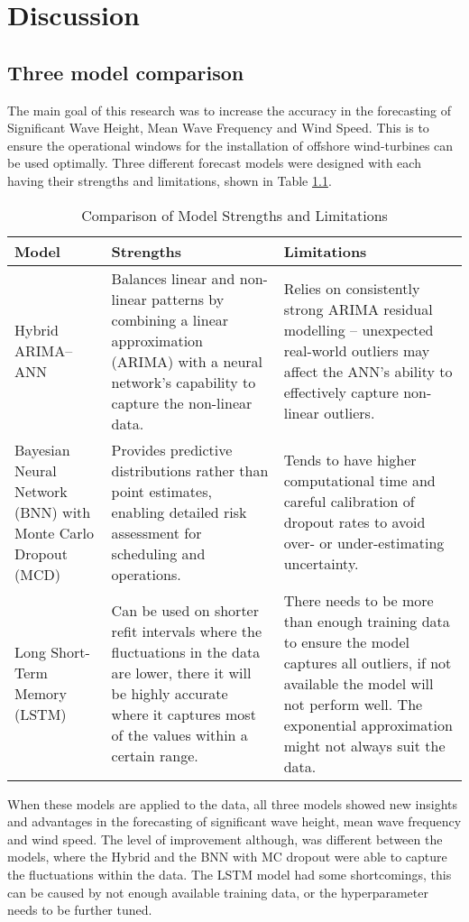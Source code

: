 \chapter{Discussion}

\section{Three model comparison}
The main goal of this research was to increase the accuracy in the forecasting of Significant Wave Height, Mean Wave Frequency and Wind Speed. This is to ensure the operational windows for the installation of offshore wind-turbines can be used optimally. Three different forecast models were designed with each having their strengths and limitations, shown in Table \ref{tab:model_comparison}. 

\begin{table}[ht!]
\centering
\begin{tabular}{|p{4cm}|p{6cm}|p{6cm}|}
\hline
\textbf{Model} & \textbf{Strengths} & \textbf{Limitations} \\
\hline
Hybrid ARIMA–ANN & 
Balances linear and non-linear patterns by combining a linear approximation (ARIMA) with a neural network’s capability to capture the non-linear data. &
Relies on consistently strong ARIMA residual modelling – unexpected real-world outliers may affect the ANN’s ability to effectively capture non-linear outliers. \\
\hline
Bayesian Neural Network (BNN) with Monte Carlo Dropout (MCD) & 
Provides predictive distributions rather than point estimates, enabling detailed risk assessment for scheduling and operations. &
Tends to have higher computational time and careful calibration of dropout rates to avoid over- or under-estimating uncertainty. \\
\hline
Long Short-Term Memory (LSTM) & 
Can be used on shorter refit intervals where the fluctuations in the data are lower, there it will be highly accurate where it captures most of the values within a certain range. &
There needs to be more than enough training data to ensure the model captures all outliers, if not available the model will not perform well. The exponential approximation might not always suit the data. \\
\hline
\end{tabular}
\caption{Comparison of Model Strengths and Limitations}
\label{tab:model_comparison}
\end{table}

\noindent When these models are applied to the data, all three models showed new insights and advantages in the forecasting of significant wave height, mean wave frequency and wind speed. The level of improvement although, was different between the models, where the Hybrid and the BNN with MC dropout were able to capture the fluctuations within the data. The LSTM model had some shortcomings, this can be caused by not enough available training data, or the hyperparameter needs to be further tuned. 

